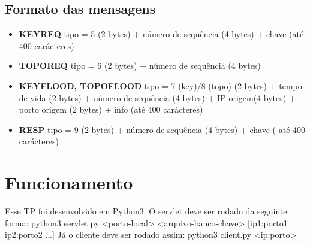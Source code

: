 \documentclass[10pt]{article}
\begin{document}
		\subsection{Formato das mensagens}
\begin{itemize}

\item \textbf{KEYREQ} tipo = 5 (2 bytes) + número de sequência (4 bytes) + chave (até 400 carácteres)
\item \textbf{TOPOREQ} tipo = 6 (2 bytes) + número de sequência (4 bytes) 
\item \textbf{KEYFLOOD, TOPOFLOOD} tipo = 7 (key)/8 (topo) (2 bytes) + tempo de vida (2 bytes) + número de sequência (4 bytes) + IP origem(4 bytes) + porto origem (2 bytes) + info (até 400 carácteres)
\item \textbf{RESP} tipo = 9 (2 bytes) + número de sequência (4 bytes) + chave ( até 400 carácteres)
\end{itemize}
\section{Funcionamento}
Esse TP foi desenvolvido em Python3.
\newline O servlet deve ser rodado da seguinte forma:
\newline python3 servlet.py <porto-local> <arquivo-banco-chave> [ip1:porto1 ip2:porto2 ...]
\newline Já o cliente deve ser rodado assim:
\newline python3 client.py <ip:porto>
\end{document}
